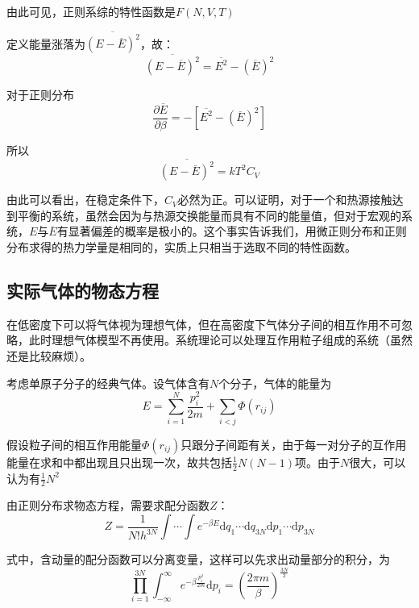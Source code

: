 \documentclass[UTF8]{ctexart}
\newcommand{\dif}{\mathrm{d}}
\begin{document}
	\noindent 由此可见，正则系综的特性函数是$ F(N,V,T) $
	
	定义能量涨落为$ \overline{\left(E-\overline{E}\right)^{2}} $，故：
	\begin{equation}
		\overline{\left(E-\overline{E}\right)^{2}}=\overline{E^{2}}-\left(\overline{E}\right)^{2}
	\end{equation}

\noindent 对于正则分布
\begin{equation}
	\frac{\partial \overline{E}}{\partial \beta}= -\left[\overline{E^{2}}-\left(\overline{E}\right)^{2}\right]
\end{equation}

\noindent 所以
\begin{equation}
	\overline{\left(E-\overline{E}\right)^{2}}=k T^{2} C_{V}
\end{equation}

\noindent 由此可以看出，在稳定条件下，$ C_{V} $必然为正。可以证明，对于一个和热源接触达到平衡的系统，虽然会因为与热源交换能量而具有不同的能量值，但对于宏观的系统，$ E $与$ \overline{E} $有显著偏差的概率是极小的。这个事实告诉我们，用微正则分布和正则分布求得的热力学量是相同的，实质上只相当于选取不同的特性函数。

	\subsection{实际气体的物态方程}
	在低密度下可以将气体视为理想气体，但在高密度下气体分子间的相互作用不可忽略，此时理想气体模型不再使用。系统理论可以处理互作用粒子组成的系统（虽然还是比较麻烦）。
	
	考虑单原子分子的经典气体。设气体含有$ N $个分子，气体的能量为
	\begin{equation}
		E= \sum_{i=1}^{N} \frac{p_{i}^{2}}{2m} + \sum_{i<j} \Phi \left(r_{ij}\right)
	\end{equation}
	
\noindent 假设粒子间的相互作用能量$ \Phi \left(r_{ij}\right) $只跟分子间距有关，由于每一对分子的互作用能量在求和中都出现且只出现一次，故共包括$ \frac{1}{2} N(N-1) $项。由于$ N $很大，可以认为有$ \frac{1}{2} N^{2} $

 	由正则分布求物态方程，需要求配分函数$ Z $：
 	\begin{equation}
 	Z=\frac{1}{N! h^{3N}} \int \cdots \int e^{-\beta E} \dif q_{1} \cdots \dif q_{3N} \dif p_{1} \cdots \dif p_{3N}
 	\end{equation}

\noindent 式中，含动量的配分函数可以分离变量，这样可以先求出动量部分的积分，为
\begin{equation}
	\prod_{i=1}^{3N} \int_{-\infty}^{\infty} e^{-\beta \frac{p_{i}^{2}}{2m}}  \dif p_{i}= \left(\frac{2 \pi m}{\beta}\right)^{\frac{3 N}{2}}
\end{equation}
\end{document}
